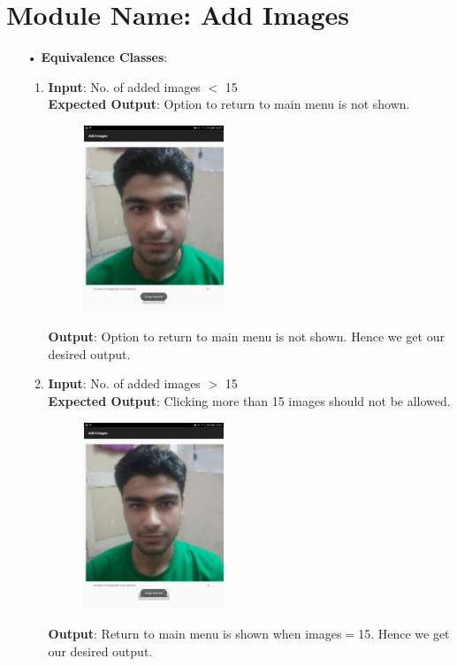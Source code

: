 \documentclass{scrreprt}
\begin{document}
\section{Module Name: Add Images}
\begin{itemize}
\item[•]\textbf{Equivalence Classes}:
\begin{enumerate}
\item \textbf{Input}: No. of added images $<$ 15 \\
\textbf{Expected Output}: Option to return to main menu is not shown.
\begin{figure}[H]
\centering
\includegraphics[width=0.42\textwidth, keepaspectratio]{imgadd.jpg}
\end{figure}
\textbf{Output}: Option to return to main menu is not shown. Hence we get our desired output.

\item \textbf{Input}:  No. of added images $>$ 15\\
\textbf{Expected Output}: Clicking more than 15 images should not be allowed.
\begin{figure}[H]
\centering
\includegraphics[width=0.42\textwidth, keepaspectratio]{imgboun.jpg}
\end{figure}
\textbf{Output}: Return to main menu is shown when images$=$15. Hence we get our desired output.


\end{enumerate}
\end{itemize}
\end{document}
